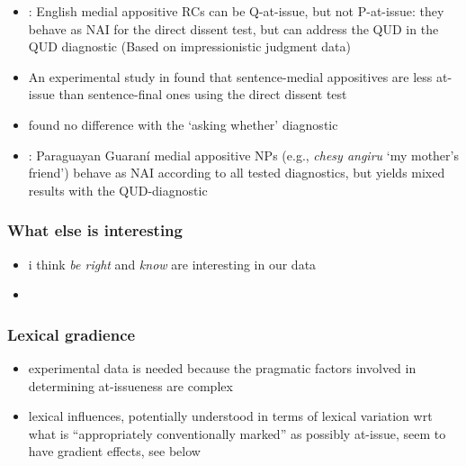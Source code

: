 \documentclass[times,linguex]{glossa}
\begin{document}
    \begin{itemize}
      \item  \citealt{koev_notions_2018}: English medial appositive RCs can be Q-at-issue, but not P-at-issue: they behave as NAI for the direct dissent test, but can address the QUD in the QUD diagnostic (Based on impressionistic judgment data)

      \item An experimental study in \citealt{syrett_experimental_2015} found that sentence-medial appositives are less at-issue than sentence-final ones using the direct dissent test
      
      \item \citealt{drozdov_projection_2024} found no difference with the `asking whether' diagnostic
      
      \item \cite{tonhauser_diagnosing_2012}: Paraguayan Guaraní medial appositive NPs (e.g., \emph{chesy angiru} \lq my mother's friend\rq) behave as NAI according to all tested diagnostics, but yields mixed results with the QUD-diagnostic
    \end{itemize}


    \subsubsection{What else is interesting}

    \begin{itemize}
      \item i think \emph{be right} and \emph{know} are interesting in our data
      \item 
    \end{itemize}
    

    \subsubsection{Lexical gradience}

    \begin{itemize}
       \item experimental data is needed because the pragmatic factors involved in determining at-issueness are complex
       \item lexical influences, potentially understood in terms of lexical variation wrt what is \enquote{appropriately conventionally marked} as possibly at-issue, seem to have gradient effects, see below
     \end{itemize} 
\end{document}
